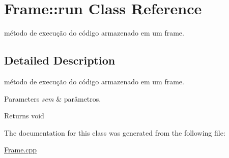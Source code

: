 \hypertarget{class_frame_1_1run}{}\section{Frame\+:\+:run Class Reference}
\label{class_frame_1_1run}


método de execução do código armazenado em um frame.  




\subsection{Detailed Description}
método de execução do código armazenado em um frame. 


\begin{DoxyParams}{Parameters}
{\em sem} & parâmetros. \\
\hline
\end{DoxyParams}
\begin{DoxyReturn}{Returns}
void 
\end{DoxyReturn}


The documentation for this class was generated from the following file\+:\begin{DoxyCompactItemize}
\item 
\hyperlink{_frame_8cpp}{Frame.\+cpp}\end{DoxyCompactItemize}
